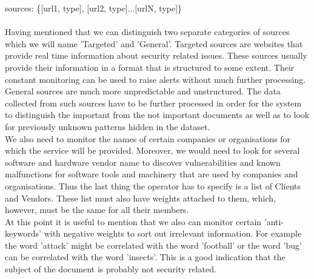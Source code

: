 \documentclass[12pt]{article}
\begin{document}
sources: \{[url1, type], [url2, type]...[urlN, type]\}\\\\
Having mentioned that we can distinguish two separate categories of sources which we will name 'Targeted' and 'General'. Targeted sources are websites that provide real time information about security related issues. These sources usually provide their information in a format that is structured to some extent. Their constant monitoring can be used to raise alerts without much further processing.
\hfill \break \\
General sources are much more unpredictable and unstructured. The data collected from such sources have to be further processed in order for the system to distinguish the important from the not important documents as well as to look for previously unknown patterns hidden in the dataset. 
\hfill \break \\
We also need to monitor the names of certain companies or organisations for which the service will be provided. Moreover, we would need to look for several software and hardware vendor name to discover vulnerabilities and known malfunctions for software tools and machinery that are used by companies and organisations. Thus the last thing the operator has to specify is a list of Clients and Vendors. These list must also have weights attached to them, which, however, must be the same for all their members. 
\hfill \break \\
At this point it is useful to mention that we also can monitor certain 'anti-keywords' with negative weights to sort out irrelevant information. For example the word 'attack' might be correlated with the word 'football' or the word 'bug' can be correlated with the word 'insects'. This is a good indication that the subject of the document is probably not security related. 
\end{document}
